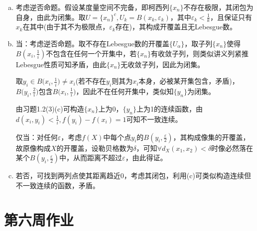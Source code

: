 \documentclass[a4paper,UTF8,fontset=windows]{ctexart}
\begin{document}
\begin{enumerate}[(1)]
\begin{enumerate}[(a)]
    \item
    考虑逆否命题。假设某度量空间不完备，即柯西列$\{x_n\}$不存在极限，其闭包为自身，由此为闭集。取$U=\{x_n\}^c,U_k=B(x_k,\varepsilon_k)$，其中$\varepsilon_k<\frac{1}{k}$，且保证只有$x_k$在其中(由于其不为极限点，$\varepsilon_k$存在)，其构成开覆盖且无Lebesgue数。
    
    \item
    当：考虑逆否命题。取不存在Lebesgue数的开覆盖$\{U_\alpha\}$，取子列$\{x_n\}$使得$B(x_i,\frac{1}{i})$不包含在任何一个开集中，若$\{x_n\}$有收敛子列，则类似讲义列紧推Lebesgue性质可知矛盾，由此$\{x_n\}$无收敛子列，因此为闭集。
    
    取$y_i\in B\big(x_i,\frac{1}{i}\big)\ne x_i$(若不存在$y_i$则其为$x_i$本身，必被某开集包含，矛盾)，$B\big(y_i,\frac{2}{i}\big)$包含$B\big(x_i,\frac{1}{i}\big)$，因此不在任何开集中，类似知$\{y_n\}$为闭集。
    
    由习题1.2(3)(c)可构造$\{x_n\}$上为0，$\{y_n\}$上为1的连续函数，由$d(x_i,y_i)<\frac{1}{i},f(y_i)-f(x_i)=1$可知不一致连续。
    
    仅当：对任何$\varepsilon$，考虑$f(X)$中每个点$y_i$的$B(y_i,\frac{\varepsilon}{2})$，其构成像集的开覆盖，故原像构成$X$的开覆盖，设勒贝格数为$\delta$，可知$\forall d_X(x_1,x_2)<\delta$时像必然落在某个$B(y_i,\frac{\varepsilon}{2})$中，从而距离不超过$\varepsilon$，由此得证。
    
    \item
    若否，可找到两列点使其距离趋近0，考虑其闭包，利用(c)可类似构造连续但不一致连续的函数，矛盾。
    \end{enumerate}
\end{enumerate}

\section{第六周作业}
\end{document}
